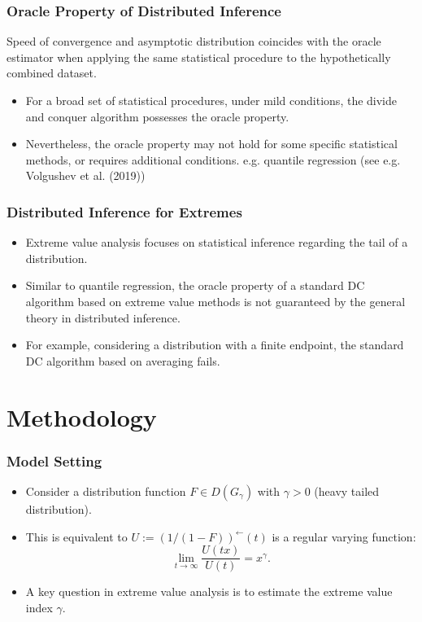 \documentclass{beamer}
\begin{document}
\begin{frame}
    \frametitle{Oracle Property of Distributed Inference}
\begin{definition}
    Speed of convergence and asymptotic distribution coincides with the oracle estimator when applying the same statistical procedure to the hypothetically
    combined dataset.
\end{definition}
    
\bigskip
\begin{itemize}
    \item For a broad set of statistical procedures, under mild conditions, the divide and conquer algorithm possesses the oracle property.
    \item Nevertheless, the oracle property may not hold for some specific statistical
    methods, or requires additional conditions. e.g. quantile regression (see e.g. Volgushev et al. (2019))
\end{itemize}

\end{frame}


\begin{frame}
    \frametitle{Distributed Inference for Extremes} 
    \begin{itemize}
        \item Extreme value analysis focuses on statistical inference regarding the tail of a distribution.
        \bigskip
        \item    Similar to quantile regression, the oracle property of a standard DC algorithm based on extreme
        value methods is not guaranteed by the general theory in distributed inference.
        \bigskip
        \item For example,
        considering a distribution with a finite endpoint, the standard DC algorithm based on averaging fails.
    \end{itemize}
\end{frame}


\section{Methodology}

\begin{frame}
    \frametitle{Model Setting}
    \begin{itemize}
        \item Consider a distribution function $F \in D(G_{\gamma})$ with $\gamma>0$ (heavy tailed distribution). 
        \bigskip
        \item  This is equivalent to $U:=(1/(1-F))^{\leftarrow}(t)$ is a regular varying function:
        $$
        \lim_{t\to \infty}\frac{U(tx)}{U(t)} = x^{\gamma}.
        $$
        \bigskip
        \item A key question in extreme value analysis is to estimate the extreme value index $\gamma$.
    \end{itemize}
\end{frame}
\end{document}
